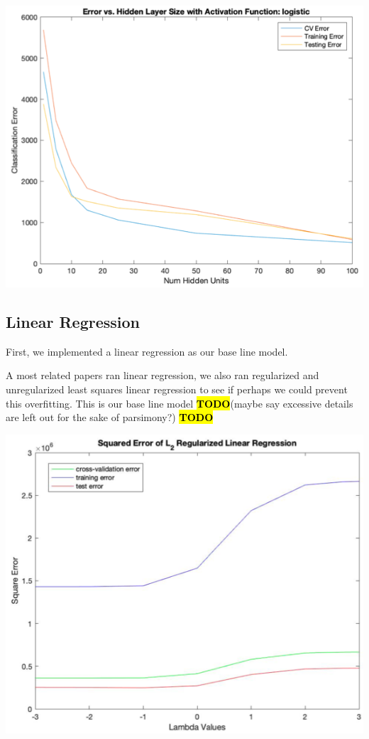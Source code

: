 \documentclass{article}
\newcommand{\TODO}{\textcolor{red}{\textbf{\hl{TODO}}}}
\begin{document}
\begin{multicols}{2}
\includegraphics[width=\columnwidth]{neur-net.png}

\subsection{Linear Regression} First, we implemented a linear regression as our base line model. 


A most related papers ran linear regression, we also ran regularized and unregularized least squares linear regression to see if perhaps we could prevent this overfitting. This is our base line model \TODO(maybe say excessive details are left out for the sake of parsimony?) \TODO 

\includegraphics[width=\columnwidth]{lin_reg.png}


\end{multicols}
\end{document}
